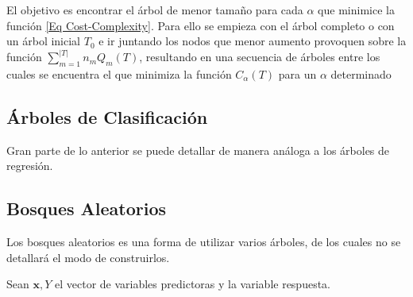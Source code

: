 \noindent El objetivo es encontrar el árbol de menor tamaño para cada $\alpha$ que minimice la función \eqref{Eq Cost-Complexity}. Para ello se empieza con el árbol completo o con un árbol inicial $T_0$ e ir juntando los nodos que menor aumento provoquen sobre la función $\sum_{m=1}^{|T|}n_m Q_m(T)$, resultando en una secuencia de árboles entre los cuales se encuentra el que minimiza la función $C_{\alpha}(T)$ para un $\alpha $ determinado

 
\subsection{Árboles de Clasificación}
Gran parte de lo anterior se puede detallar de manera análoga a los árboles de regresión. 
\subsection{Bosques Aleatorios}

\noindent Los bosques aleatorios es una forma de utilizar varios árboles, de los cuales no se detallará el modo de construirlos. 

\noindent Sean $\textbf{x}, Y$ el vector de variables predictoras y la variable respuesta.